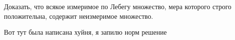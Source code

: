 \begin{task}{9}
	Доказать, что всякое измеримое по Лебегу множество, мера которого строго положительна, содержит неизмеримое множество.
\end{task}


\begin{solution}
Вот тут была написана хуйня, я запилю норм решение
\end{solution}

